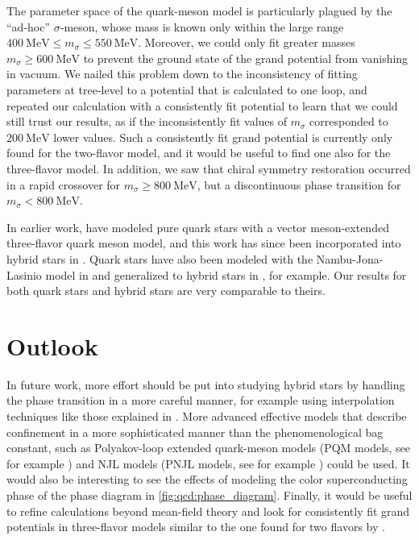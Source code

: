 The parameter space of the quark-meson model is particularly plagued by the ``ad-hoc'' $\sigma$-meson,
whose mass is known only within the large range $\SI{400}{\mega\electronvolt} \leq m_\sigma \leq \SI{550}{\mega\electronvolt}$.
Moreover, we could only fit greater masses $m_\sigma \geq \SI{600}{\mega\electronvolt}$ to prevent the ground state of the grand potential from vanishing in vacuum.
We nailed this problem down to the inconsistency of fitting parameters at tree-level to a potential that is calculated to one loop,
and repeated our calculation with a consistently fit potential to learn that we could still trust our results,
as if the inconsistently fit values of $m_\sigma$ corresponded to $\SI{200}{\mega\electronvolt}$ lower values.
Such a consistently fit grand potential is currently only found for the two-flavor model, and it would be useful to find one also for the three-flavor model.
In addition, we saw that chiral symmetry restoration occurred in a rapid crossover for $m_\sigma \geq \SI{800}{\mega\electronvolt}$,
but a discontinuous phase transition for $m_\sigma < \SI{800}{\mega\electronvolt}$.

In earlier work, \cite{ref:lsm3f_compact_stars} have modeled pure quark stars with a vector meson-extended three-flavor quark meson model,
and this work has since been incorporated into hybrid stars in \cite{ref:lsm3f_hybrid_stars}.
Quark stars have also been modeled with the Nambu-Jona-Lasinio model in \cite{ref:quark_star_njl} and generalized to hybrid stars in \cite{ref:hybrid_stars_njl}, for example.
Our results for both quark stars and hybrid stars are very comparable to theirs.


\section{Outlook}

In future work,
more effort should be put into studying hybrid stars by handling the phase transition in a more careful manner,
for example using interpolation techniques like those explained in \cite{ref:quark_star_review}.
More advanced effective models that describe confinement in a more sophisticated manner than the phenomenological bag constant,
such as Polyakov-loop extended quark-meson models (PQM models, see for example \cite{ref:pqm_2f,ref:pqm_3f,ref:master_folkestad}) and NJL models (PNJL models, see for example \cite{ref:pnjl_2f,ref:pnjl_3f,ref:pnjl_3f_zeroT}) could be used.
It would also be interesting to see the effects of modeling the color superconducting phase of the phase diagram in \cref{fig:qcd:phase_diagram}.
Finally, it would be useful to refine calculations beyond mean-field theory and
look for consistently fit grand potentials in three-flavor models similar to the one found for two flavors by \cite{ref:jo_lsm_consistent_chiral,ref:jo_lsm_consistent_physical}.
